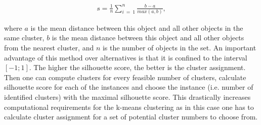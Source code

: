 \documentclass[a4paper,12pt]{article}
\begin{document}
\begin{align}\label{eq:silhouetteCalculation}
    s=\frac{1}{n}\sum_{i\ =\ 1}^{n}{\frac{b-a}{max\left(a,b\right)}},
\end{align}

where  $a$ is the mean distance between this object and all other objects in the same cluster, $b$ is the mean distance between this object and all other objects from the nearest cluster, and $n$ is the number of objects in the set. An important advantage of this method over alternatives is that it is confined to the interval $[-1;1]$. The higher the silhouette score, the better is the cluster assignment. Then one can compute clusters for every feasible number of clusters, calculate silhouette score for each of the instances and choose the instance (i.e. number of identified clusters) with the maximal silhouette score. This drastically increases computational requirements for the k-means clustering as in this case one has to calculate cluster assignment for a set of potential cluster numbers to choose from.


\newpage
\section{}\label{appendix:LogitMixedAndFixedEffectResults}
\end{document}

